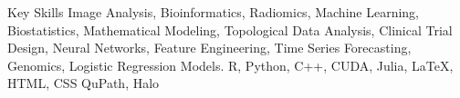 
\begin{rubric}{Key Skills}
 Image Analysis, Bioinformatics, Radiomics, Machine Learning,  Biostatistics, Mathematical Modeling, Topological Data Analysis, Clinical Trial Design, Neural Networks, Feature Engineering, Time Series Forecasting, Genomics, Logistic Regression Models.
\entry*[Programming]	R, Python,  C++, CUDA, Julia, \LaTeX, \textsc{HTML, CSS}
QuPath, Halo
%
\end{rubric}
